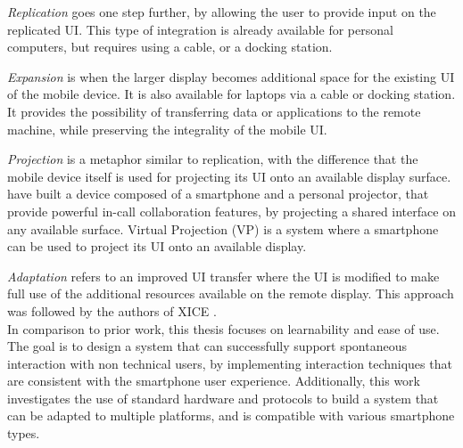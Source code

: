 \emph{Replication} goes one step further, by allowing the user to provide input on the replicated UI.
This type of integration is already available for personal computers, but requires using a cable, or a docking station.

\emph{Expansion} is when the larger display becomes additional space for the existing UI of the mobile device.
It is also available for laptops via a cable or docking station.
It provides the possibility of transferring data or applications to the remote  machine, while preserving the integrality of the mobile UI.

\emph{Projection} is a metaphor similar to replication, with the difference that the mobile device itself is used for projecting its UI onto an available display surface.
\cite{Winkler:2011:interactivephonecall} have built a device composed of a smartphone and a personal projector, that provide powerful in-call collaboration features, by projecting a shared interface on any available surface.
Virtual Projection (VP) \citep{Baur:2012:virtualprojection} is a system where a smartphone can be used to project its UI onto an available display.

\emph{Adaptation} refers to an improved UI transfer where the UI is modified to make full use of the additional resources available on the remote display.
This approach was followed by the authors of XICE \citep{Arthur:2011:xice}.
\\
\linebreak
In comparison to prior work, this thesis focuses on learnability and ease of use.
The goal is to design a system that can successfully support spontaneous interaction with non technical users, by implementing interaction techniques that are consistent with the smartphone user experience.
Additionally, this work investigates the use of standard hardware and protocols to build a system that can be adapted to multiple platforms, and is compatible with various smartphone types.

